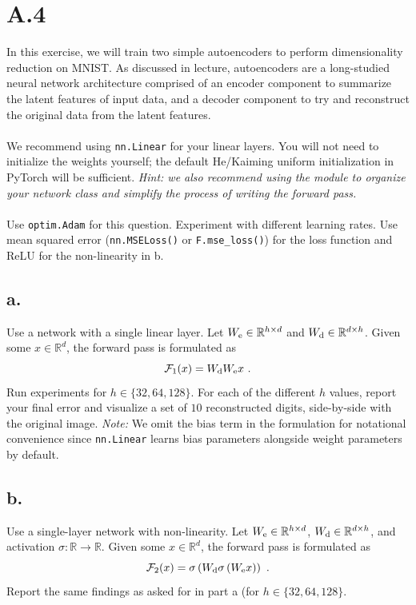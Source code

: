 \documentclass{article}
\newcommand{\1}{\mathbf{1}}
\begin{document}
\section*{A.4}
{\Large 

In this exercise, we will train two simple autoencoders to perform
dimensionality reduction on MNIST. As discussed in lecture, autoencoders are a
long-studied neural network architecture comprised of an encoder component to
summarize the latent features of input data, and a decoder component to try and
reconstruct the original data from the latent features. \\ \\

We recommend using \texttt{nn.Linear} for your linear layers. You will not need to initialize the weights yourself; the default He/Kaiming uniform initialization in PyTorch will be sufficient. \emph{Hint: we also recommend using the  module to organize your
network class and simplify the process of writing the forward pass.} \\ \\

Use \texttt{optim.Adam} for this question. Experiment with different learning rates. Use mean
squared error (\texttt{nn.MSELoss()} or \texttt{F.mse\_loss()}) for the loss function and ReLU for the non-linearity in b.

\subsection*{a.}

Use a network with a single linear layer. Let $W_{\rm e} \in \mathbb{R}^{h \times d}$ and
    $W_{\rm d} \in \mathbb{R}^{d\times h}$. Given some $x \in \mathbb{R}^d$,
    the forward pass is formulated as
    \[
      \mathcal{F}_{1}(x) = W_{\rm d} W_{\rm e} x\ .
    \]
    Run experiments for $h \in \{ 32, 64, 128 \}$. For each of the different $h$ values, report your final error and visualize a set of $10$ reconstructed digits, side-by-side with the original image. \emph{Note:} We omit the bias term in the formulation for notational convenience since \texttt{nn.Linear} learns bias parameters alongside weight parameters by default.

\subsection*{b.}

Use a single-layer network with non-linearity. Let $W_{\rm e} \in \mathbb{R}^{h \times d}$, $W_{\rm d} \in \mathbb{R}^{d\times h}$, and activation $\sigma\colon \mathbb{R} \to \mathbb{R}$. Given some $x \in \mathbb{R}^d$, the forward pass is formulated as 
    \[
      \mathcal{F}_{2}(x) = \sigma\left(W_{\rm d} \sigma\left(W_{\rm e} x\right)\right)\ .
    \]
    Report the same findings as asked for in part a (for $h \in \{ 32, 64, 128 \}$.

}
\end{document}
